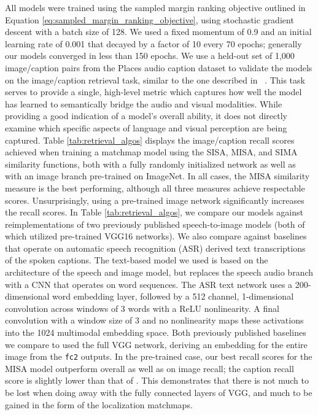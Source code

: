 All models were trained using the sampled margin ranking objective outlined in Equation \ref{eq:sampled_margin_ranking_objective}, using stochastic gradient descent with a batch size of 128. We used a fixed momentum of 0.9 and an initial learning rate of 0.001 that decayed by a factor of 10 every 70 epochs; generally our models converged in less than 150 epochs. We use a held-out set of 1,000 image/caption pairs from the Places audio caption dataset to validate the models on the image/caption retrieval task, similar to the one described in ~\cite{harwath_nips,harwath_acl_2017,chrupala_2017,alishahi_2017}. This task serves to provide a single, high-level metric which captures how well the model has learned to semantically bridge the audio and visual modalities. While providing a good indication of a model's overall ability, it does not directly examine which specific aspects of language and visual perception are being captured. Table \ref{tab:retrieval_algos} displays the image/caption recall scores achieved when training a matchmap model using the SISA, MISA, and SIMA similarity functions, both with a fully randomly initialized network as well as with an image branch pre-trained on ImageNet. In all cases, the MISA similarity measure is the best performing, although all three measures achieve respectable scores. Unsurprisingly, using a pre-trained image network significantly increases the recall scores. In Table \ref{tab:retrieval_algos}, we compare our models against reimplementations of two previously published speech-to-image models (both of which utilized pre-trained VGG16 networks). We also compare against baselines that operate on automatic speech recognition (ASR) derived text transcriptions of the spoken captions. The text-based model we used is based on the architecture of the speech and image model, but replaces the speech audio branch with a CNN that operates on word sequences. The ASR text network uses a 200-dimensional word embedding layer, followed by a 512 channel, 1-dimensional convolution across windows of 3 words with a ReLU nonlinearity. A final convolution with a window size of 3 and no nonlinearity maps these activations into the 1024 multimodal embedding space. Both previously published baselines we compare to used the full VGG network, deriving an embedding for the entire image from the \texttt{fc2} outputs. In the pre-trained case, our best recall scores for the MISA model outperform \cite{harwath_nips} overall as well as \cite{harwath_acl_2017} on image recall; the caption recall score is slightly lower than that of \cite{harwath_acl_2017}. This demonstrates that there is not much to be lost when doing away with the fully connected layers of VGG, and much to be gained in the form of the localization matchmaps.

